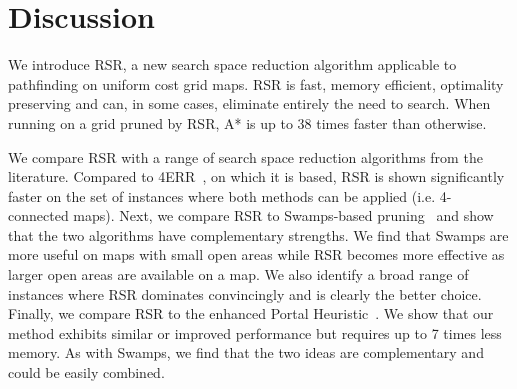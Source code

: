 \section{Discussion}
\label{cha::rsr::discussion}

We introduce RSR, a new search space reduction algorithm applicable to
pathfinding on uniform cost grid maps. RSR is fast, memory efficient,
optimality preserving and can, in some cases, eliminate entirely the need
to search.  
When running on a grid pruned by RSR, A* is up to 38 times faster than
otherwise.
\par
We compare RSR with a range of search space reduction algorithms from the
literature. Compared to 4ERR~\cite{harabor10}, on which it is based, RSR is
shown significantly faster on the set of instances where both methods can be
applied (i.e. 4-connected maps).  Next, we compare RSR to Swamps-based
pruning~\cite{pochter10} and show that the two algorithms have complementary
strengths.  We find that Swamps are more useful on maps with small open areas
while RSR becomes more effective as larger open areas are available on a map. We
also identify a broad range of instances where RSR dominates convincingly and is
clearly the better choice.  Finally, we compare RSR to the enhanced Portal
Heuristic~\cite{goldenberg10}.  We show that our method exhibits similar or
improved performance but requires up to 7 times less memory.  As with Swamps, we
find that the two ideas are complementary and could be easily combined.
